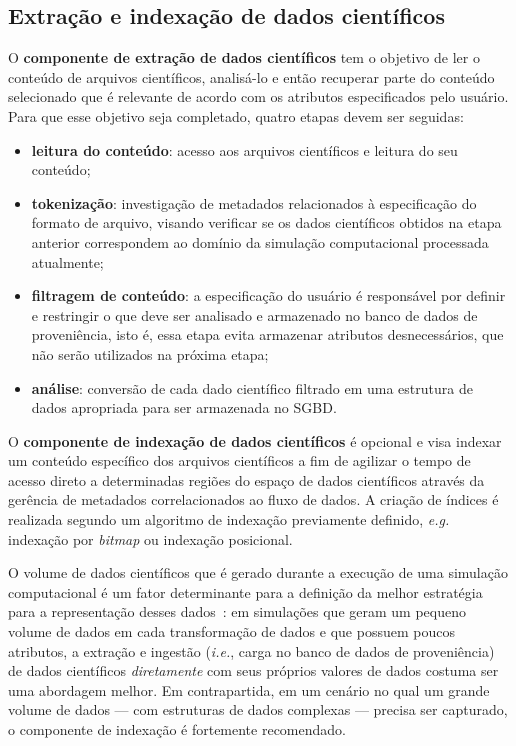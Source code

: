 \subsection{Extração e indexação de dados científicos}

O \textbf{componente de extração de dados científicos} tem o objetivo de ler o conteúdo de arquivos científicos, analisá-lo e então recuperar parte do conteúdo selecionado que é relevante de acordo com os atributos especificados pelo usuário. Para que esse objetivo seja completado, quatro etapas devem ser seguidas:

\begin{itemize}
    \item \textbf{leitura do conteúdo}: acesso aos arquivos científicos e leitura do seu conteúdo;
    \item \textbf{tokenização}: investigação de metadados relacionados à especificação do formato de arquivo, visando verificar se os dados científicos obtidos na etapa anterior correspondem ao domínio da simulação computacional processada atualmente;
    \item \textbf{filtragem de conteúdo}: a especificação do usuário é responsável por definir e restringir o que deve ser analisado e armazenado no banco de dados de proveniência, isto é, essa etapa evita armazenar atributos desnecessários, que não serão utilizados na próxima etapa;
    \item \textbf{análise}: conversão de cada dado científico filtrado em uma estrutura de dados apropriada para ser armazenada no SGBD.
\end{itemize}

O \textbf{componente de indexação de dados científicos} é opcional e visa indexar um conteúdo específico dos arquivos científicos a fim de agilizar o tempo de acesso direto a determinadas regiões do espaço de dados científicos através da gerência de metadados correlacionados ao fluxo de dados. A criação de índices é realizada segundo um algoritmo de indexação previamente definido, \textit{e.g.} indexação por \textit{bitmap} ou indexação posicional.

O volume de dados científicos que é gerado durante a execução de uma simulação computacional é um fator determinante para a definição da melhor estratégia para a representação desses dados~\cite{silva2015propostadoutorado}: em simulações que geram um pequeno volume de dados em cada transformação de dados e que possuem poucos atributos, a extração e ingestão (\textit{i.e.}, carga no banco de dados de proveniência) de dados científicos \emph{diretamente} com seus próprios valores de dados costuma ser uma abordagem melhor. Em contrapartida, em um cenário no qual um grande volume de dados --- com estruturas de dados complexas --- precisa ser capturado, o componente de indexação é fortemente recomendado.

